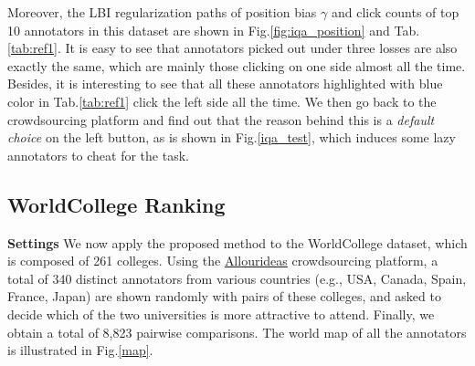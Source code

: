 \documentclass[10pt,journal,cspaper,compsoc]{IEEEtran}
\begin{document}
{Moreover, the LBI regularization paths of position bias $\gamma$ and click counts of top 10 annotators in this dataset are shown in Fig.\ref{fig:iqa_position} and Tab.\ref{tab:ref1}. It is easy to see that annotators picked out under three losses are also exactly the same, which are mainly those clicking on
one side almost all the time. Besides, it is interesting to see
that all these annotators highlighted with blue color in
Tab.\ref{tab:ref1} click the left side all the time. We then go back to
the crowdsourcing platform and find out that the reason behind
this is a \emph{default choice} on the left button, as is shown in Fig.\ref{iqa_test}, which induces
some lazy annotators to cheat for the task.



\subsection{WorldCollege Ranking}

\textbf{Settings} We now apply the proposed method to the WorldCollege dataset, which is composed of 261 colleges. Using the \href{http://www.allourideas.org/}{Allourideas} crowdsourcing platform, a total of 340 distinct annotators from various countries (e.g., USA, Canada, Spain, France, Japan)
are shown randomly with pairs of these colleges, and asked to decide which of the
two universities is more attractive to attend. Finally, we obtain a
total of 8,823 pairwise comparisons. The world map of all the annotators
is illustrated in Fig.\ref{map}.

}
\end{document}
